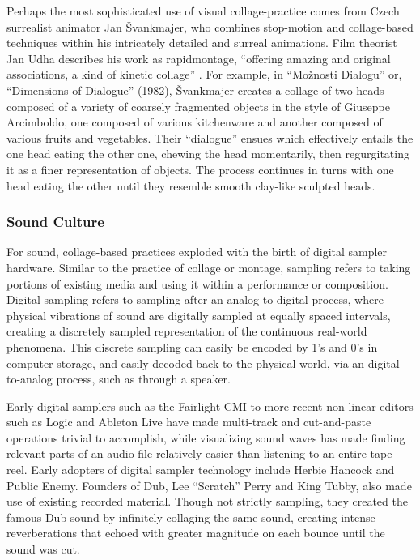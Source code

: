 \documentclass[a4paper,10pt,final]{ThesisStyle}
\begin{document}
Perhaps the most sophisticated use of visual collage-practice comes from Czech surrealist animator Jan {\v S}vankmajer, who combines stop-motion and collage-based techniques within his intricately detailed and surreal animations.  Film theorist Jan Udha describes his work as rapidmontage, ``offering amazing and original associations, a kind of kinetic collage'' \cite{Uhde}.  For example, in ``Mo{\v z}nosti Dialogu'' or, ``Dimensions of Dialogue'' (1982), {\v S}vankmajer creates a collage of two heads composed of a variety of coarsely fragmented objects in the style of Giuseppe Arcimboldo, one composed of various kitchenware and another composed of various fruits and vegetables.  Their ``dialogue'' ensues which effectively entails the one head eating the other one, chewing the head momentarily, then regurgitating it as a finer representation of objects.  The process continues in turns with one head eating the other until they resemble smooth clay-like sculpted heads.  

\subsubsection{Sound Culture}
For sound, collage-based practices exploded with the birth of digital sampler hardware.  Similar to the practice of collage or montage, sampling refers to taking portions of existing media and using it within a performance or composition.  Digital sampling refers to sampling after an analog-to-digital process, where physical vibrations of sound are digitally sampled at equally spaced intervals, creating a discretely sampled representation of the continuous real-world phenomena.  This discrete sampling can easily be encoded by 1's and 0's in computer storage, and easily decoded back to the physical world, via an digital-to-analog process, such as through a speaker.  

Early digital samplers such as the Fairlight CMI to more recent non-linear editors such as Logic and Ableton Live have made multi-track and cut-and-paste operations trivial to accomplish, while visualizing sound waves has made finding relevant parts of an audio file relatively easier than listening to an entire tape reel.  Early adopters of digital sampler technology include Herbie Hancock and Public Enemy.  Founders of Dub, Lee ``Scratch'' Perry and King Tubby, also made use of existing recorded material.  Though not strictly sampling, they created the famous Dub sound by infinitely collaging the same sound, creating intense reverberations that echoed with greater magnitude on each bounce until the sound was cut.  
\end{document}
